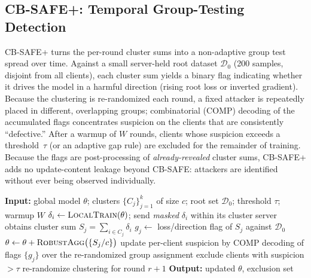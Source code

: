\documentclass[conference]{IEEEtran}
\begin{document}
\subsection{CB-SAFE+: Temporal Group-Testing Detection}
CB-SAFE+ turns the per-round cluster sums into a non-adaptive group test spread over
time. Against a small server-held root dataset $\mathcal{D}_0$ (200 samples, disjoint
from all clients), each cluster sum yields a binary flag indicating whether it drives
the model in a harmful direction (rising root loss or inverted gradient). Because the
clustering is re-randomized each round, a fixed attacker is repeatedly placed in
different, overlapping groups; combinatorial (COMP) decoding of the accumulated flags
concentrates suspicion on the clients that are consistently ``defective.'' After a
warmup of $W$ rounds, clients whose suspicion exceeds a threshold~$\tau$ (or an
adaptive gap rule) are excluded for the remainder of training. Because the flags are
post-processing of \emph{already-revealed} cluster sums, CB-SAFE+ adds no
update-content leakage beyond CB-SAFE: attackers are identified without ever being
observed individually.

\begin{algorithm}[t]
\caption{CB-SAFE round $r$ (server view)}
\label{alg:round}
\begin{algorithmic}[1]
\State \textbf{Input:} global model $\theta$; clusters $\{C_j\}_{j=1}^{k}$ of size $c$;
root set $\mathcal{D}_0$; threshold $\tau$; warmup $W$
  \State $\delta_i \gets \textsc{LocalTrain}(\theta)$; send \emph{masked} $\delta_i$ within its cluster
\EndFor
{}
  \State server obtains cluster sum $S_j=\sum_{i\in C_j}\delta_i$ 
  \State $g_j \gets$ loss/direction flag of $S_j$ against $\mathcal{D}_0$
\EndFor
\State $\theta \gets \theta + \textsc{RobustAgg}\big(\{S_j/c\}\big)$ 
  \State update per-client suspicion by COMP decoding of flags $\{g_j\}$ over the
  re-randomized group assignment 
  \State exclude clients with suspicion $>\tau$
\EndIf
\State re-randomize clustering for round $r{+}1$
\State \textbf{Output:} updated $\theta$, exclusion set
\end{algorithmic}
\end{algorithm}
\end{document}

